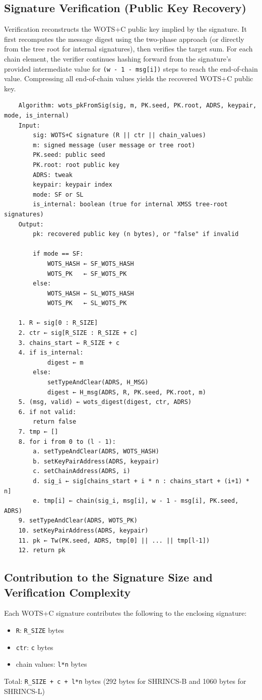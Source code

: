 \subsection{Signature Verification (Public Key Recovery)}
Verification reconstructs the WOTS+C public key implied by the signature. It first recomputes the message digest using the two-phase approach (or directly from the tree root for internal signatures), then verifies the target sum. For each chain element, the verifier continues hashing forward from the signature's provided intermediate value for \texttt{(w - 1 - msg[i])} steps to reach the end-of-chain value. Compressing all end-of-chain values yields the recovered WOTS+C public key.
\begin{verbatim}
    Algorithm: wots_pkFromSig(sig, m, PK.seed, PK.root, ADRS, keypair, mode, is_internal)
    Input:
        sig: WOTS+C signature (R || ctr || chain_values)
        m: signed message (user message or tree root)
        PK.seed: public seed
        PK.root: root public key
        ADRS: tweak
        keypair: keypair index
        mode: SF or SL
        is_internal: boolean (true for internal XMSS tree-root signatures)
    Output:
        pk: recovered public key (n bytes), or "false" if invalid

        if mode == SF:
            WOTS_HASH ← SF_WOTS_HASH
            WOTS_PK   ← SF_WOTS_PK 
        else:
            WOTS_HASH ← SL_WOTS_HASH
            WOTS_PK   ← SL_WOTS_PK

    1. R ← sig[0 : R_SIZE]
    2. ctr ← sig[R_SIZE : R_SIZE + c]
    3. chains_start ← R_SIZE + c
    4. if is_internal:
            digest ← m
        else:
            setTypeAndClear(ADRS, H_MSG)
            digest ← H_msg(ADRS, R, PK.seed, PK.root, m)
    5. (msg, valid) ← wots_digest(digest, ctr, ADRS)
    6. if not valid:
        return false
    7. tmp ← []
    8. for i from 0 to (l - 1):
        a. setTypeAndClear(ADRS, WOTS_HASH)
        b. setKeyPairAddress(ADRS, keypair)
        c. setChainAddress(ADRS, i)
        d. sig_i ← sig[chains_start + i * n : chains_start + (i+1) * n]
        e. tmp[i] ← chain(sig_i, msg[i], w - 1 - msg[i], PK.seed, ADRS)
    9. setTypeAndClear(ADRS, WOTS_PK)
    10. setKeyPairAddress(ADRS, keypair)
    11. pk ← Tw(PK.seed, ADRS, tmp[0] || ... || tmp[l-1])
    12. return pk
\end{verbatim}

\subsection{Contribution to the Signature Size and Verification Complexity}
Each WOTS+C signature contributes the following to the enclosing signature:
\begin{itemize}
    \item \texttt{R}: \texttt{R\_SIZE} bytes
    \item \texttt{ctr}: \texttt{c} bytes
    \item chain values: \texttt{l*n} bytes
\end{itemize}
Total: \texttt{R\_SIZE + c + l*n} bytes (292 bytes for SHRINCS-B and 1060 bytes for SHRINCS-L)

